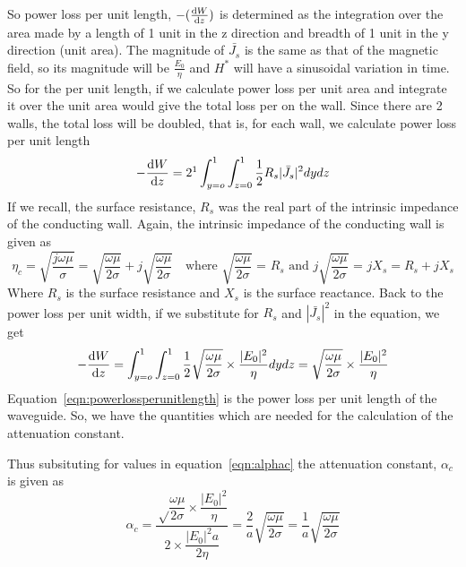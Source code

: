 So power loss per unit length, $-(\derivative{W}{z})$ is determined as the integration over the area made by a length of 1 unit in the z direction and breadth of 1 unit in the y direction (unit area). The magnitude of $ \bar{J_s} $ is the same as that of the magnetic field, so its magnitude will be $ \frac{E_0}{\eta} $ and $H^\ast$ will have a sinusoidal variation in time. So for the per unit length, if we calculate power loss per unit area and integrate it over the unit area would give the total loss per on the wall. Since there are 2 walls, the total loss will be doubled, that is, for each wall, we calculate power loss per unit length
\begin{equation*}
-\derivative{W}{z} = 2\footnotemark \int_{y=o}^{1} \int_{z=0}^{1}\frac{1}{2}R_s|\bar{J_s}|^2dydz
\end{equation*}
If we recall, the surface resistance, $R_s$ was the real part of the intrinsic impedance of the conducting wall. Again, the intrinsic impedance of the conducting wall is given as
\begin{dmath*}
\eta_c = \sqrt{\frac{j\omega\mu}{\sigma}}
= \sqrt{\frac{\omega\mu}{2\sigma}}+j\sqrt{\frac{\omega\mu}{2\sigma}}\quad\text{where }\sqrt{\frac{\omega\mu}{2\sigma}}\text{ = }R_s\text{ and }j\sqrt{\frac{\omega\mu}{2\sigma}}\text{ = }jX_s
= R_s + jX_s
\end{dmath*}
Where $R_s$ is the surface resistance and $X_s$ is the surface reactance. Back to the power loss per unit width, if we substitute for $R_s$ and $|\bar{J_s}|^2$ in the equation, we get
\begin{dmath}
-\derivative{W}{z} = \int_{y=o}^{1} \int_{z=0}^{1}\frac{1}{2}\sqrt{\frac{\omega\mu}{2\sigma}}\times\frac{|E_0|^2}{\eta}dydz
= \sqrt{\frac{\omega\mu}{2\sigma}}\times\frac{|E_0|^2}{\eta}
\label{eqn:powerlossperunitlength}
\end{dmath}
Equation~\eqref{eqn:powerlossperunitlength} is the power loss per unit length of the waveguide. So, we have the quantities which are needed for the calculation of the attenuation constant.

Thus subsituting for values in equation~\eqref{eqn:alphac} the attenuation constant, $\alpha_c$ is given as 
\begin{dmath}
\alpha_c = \frac{\sqrt\dfrac{\omega\mu}{2 \sigma}\times\dfrac{|E_0|^2}{\eta}}{2 \times \dfrac{|E_0|^2 a}{2 \eta}}
= \frac{2}{a}\sqrt{\frac{\omega\mu}{2\sigma}}=\frac{1}{a}\sqrt{\frac{\omega\mu}{2\sigma}}
\end{dmath}

